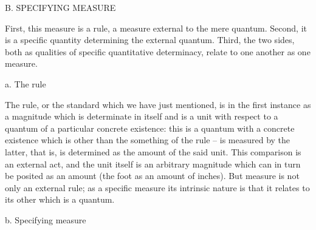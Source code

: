 B. SPECIFYING MEASURE

First, this measure is a rule, a measure external to the mere quantum.
Second, it is a specific quantity determining the external quantum.
Third, the two sides, both as qualities of specific quantitative determinacy,
relate to one another as one measure.

a. The rule

The rule, or the standard which we have just mentioned, is in the first
instance as a magnitude which is determinate in itself and is a unit with
respect to a quantum of a particular concrete existence: this is a quantum
with a concrete existence which is other than the something of the rule –
is measured by the latter, that is, is determined as the amount of the said
unit. This comparison is an external act, and the unit itself is an arbitrary
magnitude which can in turn be posited as an amount (the foot as an
amount of inches). But measure is not only an external rule; as a specific
measure its intrinsic nature is that it relates to its other which is a quantum.

b. Specifying measure

